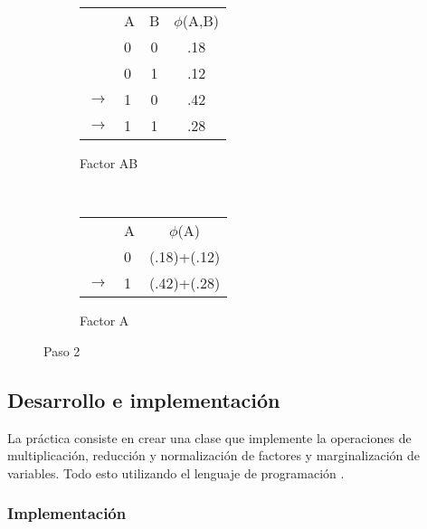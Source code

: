 \begin{figure}[H]
    \centering
    \begin{subfigure}[b]{0.4\textwidth}
        \centering
        \begin{tabular}{ l l  c | c }
           & A & B & $\phi$(A,B)\\ \cline{2-4}
           & 0 & 0 & .18  \\ \cline{2-4}
           & 0 & 1 & .12  \\ \cline{2-4}
          \(\to\) & 1 & 0 & .42  \\ \cline{2-4}
          \(\to\) & 1 & 1 & .28  \\
        \end{tabular}
        \caption{Factor AB}
    \end{subfigure}
    ~ 
    \begin{subfigure}[b]{0.4\textwidth}
        \centering
        \begin{tabular}{l  l | c }
            & A & $\phi$(A)\\ \cline{2-3}
            & 0 & (.18)+(.12)  \\ \cline{2-3}
        \(\to\) & 1 & (.42)+(.28)  \\
        \end{tabular}
        \caption{Factor A}
    \end{subfigure}
    \caption{Paso 2}
\end{figure}


\subsection{Desarrollo e implementaci\'on}

\noindent La práctica consiste en crear una clase  que implemente la operaciones de multiplicación, reducción y normalización de factores y marginalización de variables. Todo esto utilizando el lenguaje de programación .


\subsubsection{Implementaci\'on}

